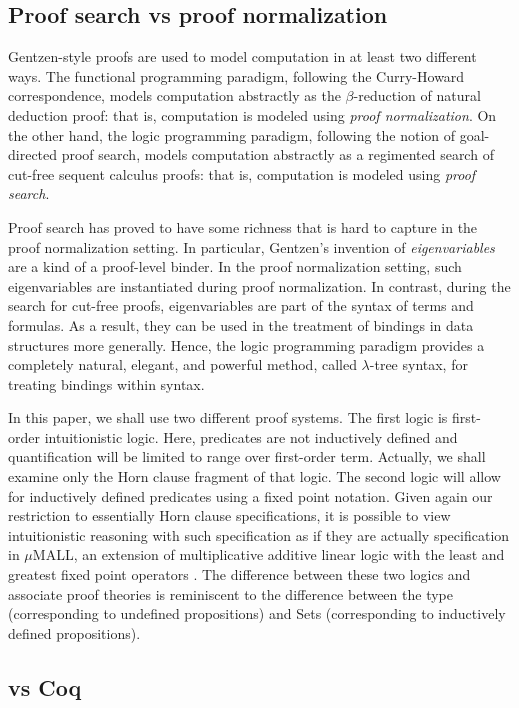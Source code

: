 \documentclass[a4paper,USenglish,cleveref, autoref, thm-restate]{lipics-v2019}
\begin{document}
\subsection{Proof search vs proof normalization}

Gentzen-style proofs are used to model computation in at least two
different ways.  The functional programming paradigm, following the
Curry-Howard correspondence, models computation abstractly as the
$\beta$-reduction of natural deduction proof: that is, computation is
modeled using \emph{proof normalization}.  On the other hand, the
logic programming paradigm, following the notion of goal-directed
proof search, models computation abstractly as a regimented search of
cut-free sequent calculus proofs: that is, computation is modeled
using \emph{proof search}.

Proof search has proved to have some richness that is hard to capture
in the proof normalization setting.  In particular, Gentzen's
invention of \emph{eigenvariables} are a kind of a proof-level
binder.  In the proof normalization setting, such eigenvariables
are instantiated during proof normalization.  In contrast, during the
search for cut-free proofs, eigenvariables are part of the syntax of
terms and formulas.  As a result, they can be used in the treatment of
bindings in data structures more generally.  Hence, the logic
programming paradigm provides a completely natural, elegant, and
powerful method, called $\lambda$-tree syntax, for treating bindings
within syntax.

In this paper, we shall use two different proof systems.  The first
logic is first-order intuitionistic logic.  Here, predicates
are not inductively defined and quantification will be limited to
range over first-order term.  Actually, we shall examine only the Horn
clause fragment of that logic.
%
The second logic will allow for inductively defined predicates using a
fixed point notation.   Given again our restriction to essentially
Horn clause specifications, it is possible to view intuitionistic
reasoning with such specification as if they are actually
specification in $\mu$MALL, an extension of multiplicative additive
linear logic with the least and greatest fixed point operators
\cite{baelde12tocl,baelde07lpar,heath19jar}.
%
The difference between these two logics and associate proof theories
is reminiscent to the difference between the type 
(corresponding to undefined propositions) and Sets (corresponding to
inductively defined propositions).

\subsection{\lP vs Coq}
\end{document}
